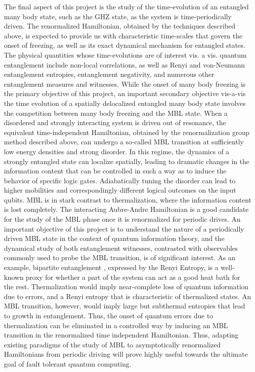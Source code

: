 \documentclass[a4paper,9pt]{article}
\begin{document}
The final aspect of this project is the study of the time-evolution of an entangled many body state, such as the GHZ state,  as the system is time-periodically driven. The renormalized Hamiltonian, obtained by the techniques described above, is expected to provide us with characteristic time-scales that govern the onset of freezing, as well as its exact dynamical mechanism for entangled states. The physical quantities whose time-evolutions are of interest vis. a vis. quantum entanglement include non-local correlations, as well as Renyi and von-Neumann entanglement entropies, entanglement negativity, and numerous other entanglement measures and witnesses. While the onset of many body freezing is the primary objective of this project, an important secondary objective vis-a-vis the time evolution of a spatially delocalized entangled many body state involves the competition between many body freezing and the MBL state. When a disordered and strongly interacting system is driven out of resonance, the equivalent time-independent Hamiltonian, obtained by the renormalization group method described above, can undergo a so-called MBL transition at sufficiently low energy densities and strong disorder. In this regime,  the dynamics of a strongly entangled state can localize spatially, leading to dramatic changes in the information content that can be controlled in such a way as to induce the behavior of specific logic gates. Adiabatically tuning the disorder can lead to higher mobilities and correspondingly different logical outcomes on the input qubits. MBL is in stark contrast to thermalization, where the information content is lost completely. The interacting Aubre-Andre Hamiltonian is a good candidate for the study of the MBL phase once it is renormalized for periodic drives. An important objective of this project is to understand the nature of a periodically driven MBL state in the context of quantum information theory, and the dynamical study of both entanglement witnesses, contrasted with observables commonly used to probe the MBL transition, is of significant interest. As an example, bipartite entanglement , expressed by the Renyi Entropy, is a well-known proxy for whether a part of the system can act as a good heat bath for the rest. Thermalization would imply near-complete loss of quantum information due to errors, and a Renyi entropy that is characteristic of thermalized states. An MBL transition, however, would imply large but subthermal entropies that lead to growth in entanglement. Thus, the onset of quantum errors due to thermalization can be eliminated in a controlled way by inducing an MBL transition in the renormalized time independent Hamiltonian. Thus, adapting existing paradigms of the study of MBL to asymptotically renormalized Hamiltonians from periodic driving will prove highly useful towards the ultimate goal of fault tolerant quantum computing.
\end{document}
